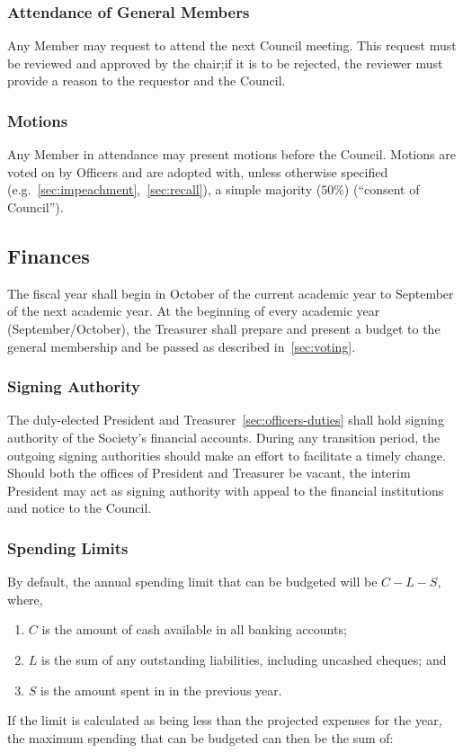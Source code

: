 \subsubsection{Attendance of General Members}
Any Member may request to attend the next Council meeting. This request must be
reviewed and approved by the chair;\@ if it is to be rejected, the reviewer
must provide a reason to the requestor and the Council.

\subsubsection{Motions}
Any Member in attendance may present motions before the Council. Motions are
voted on by Officers and are adopted with, unless otherwise specified
(e.g.~\ref{sec:impeachment},~\ref{sec:recall}), a simple majority ($50\%$)
(``consent of Council'').

\subsection{Finances}\label{sec:finances}
The fiscal year shall begin in October of the current academic year to
September of the next academic year. At the beginning of every academic year
(September/October), the Treasurer shall prepare and present a budget to the
general membership and be passed as described in~\ref{sec:voting}.

\subsubsection{Signing Authority}

The duly-elected President and Treasurer~\ref{sec:officers-duties} shall hold
signing authority of the Society's financial accounts. During any transition
period, the outgoing signing authorities should make an effort to facilitate a
timely change. Should both the offices of President and Treasurer be vacant,
the interim President may act as signing authority with appeal to the financial
institutions and notice to the Council.

\subsubsection{Spending Limits}
By default, the annual spending limit that can be budgeted will be $C - L - S$,
where,
\begin{enumerate}
      \item $C$ is the amount of cash available in all banking accounts;
      \item $L$ is the sum of any outstanding liabilities, including uncashed cheques; and
      \item $S$ is the amount spent in in the previous year.
\end{enumerate}
If the limit is calculated as being less than the projected expenses for the year, the maximum spending that can be budgeted can then be the sum of:

